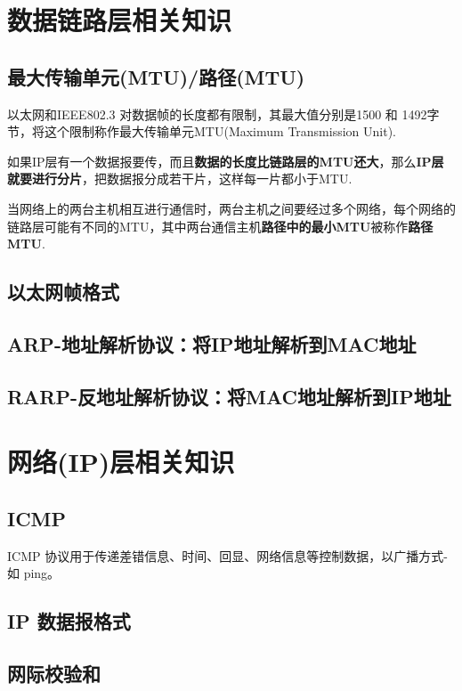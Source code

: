 \documentclass[UTF8,a4paper,8pt]{ctexbook}
\begin{document}
	\section{数据链路层相关知识}
		\subsection{最大传输单元(MTU)/路径(MTU)}
			以太网和IEEE802.3 对数据帧的长度都有限制，其最大值分别是1500 和 1492字节，将这个限制称作最大传输单元MTU(Maximum Transmission Unit).
			
			如果IP层有一个数据报要传，而且\textbf{数据的长度比链路层的MTU还大}，那么\textbf{IP层就要进行分片}，把数据报分成若干片，这样每一片都小于MTU.
			
			当网络上的两台主机相互进行通信时，两台主机之间要经过多个网络，每个网络的链路层可能有不同的MTU，其中两台通信主机\textbf{路径中的最小MTU}被称作\textbf{路径MTU}.
			
		\subsection{以太网帧格式}
		
		\subsection{ARP-地址解析协议：将IP地址解析到MAC地址}
		
		\subsection{RARP-反地址解析协议：将MAC地址解析到IP地址}
		
	\section{网络(IP)层相关知识}
		\subsection{ICMP}
			ICMP 协议用于传递差错信息、时间、回显、网络信息等控制数据，以广播方式-如 ping。
		\subsection{IP 数据报格式}
		
		\subsection{网际校验和}
		
\end{document}
